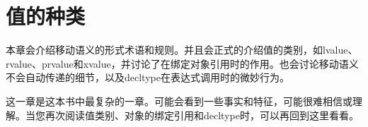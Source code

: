 \chapter{值的种类}
本章会介绍移动语义的形式术语和规则。并且会正式的介绍值的类别，如lvalue、rvalue、prvalue和xvalue，并讨论了在绑定对象引用时的作用。也会讨论移动语义不会自动传递的细节，以及decltype在表达式调用时的微妙行为。

这一章是这本书中最复杂的一章。可能会看到一些事实和特征，可能很难相信或理解。当您再次阅读值类别、对象的绑定引用和decltype时，可以再回到这里看看。






